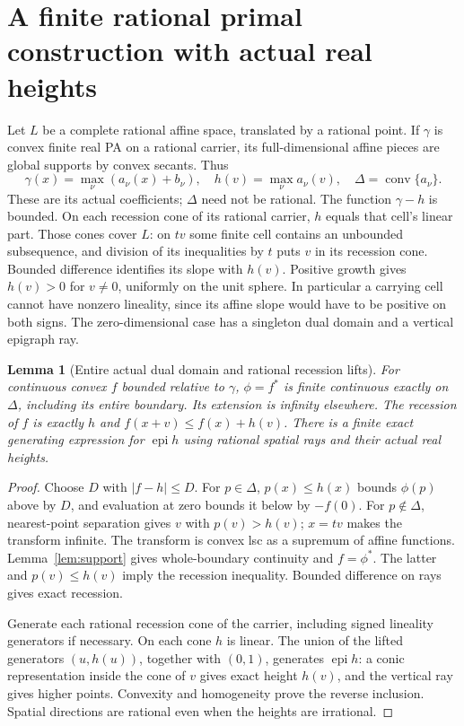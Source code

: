\documentclass[11pt]{article}
\newtheorem{lemma}[theorem]{Lemma}
\newcommand{\epi}{\operatorname{epi}}
\newcommand{\conv}{\operatorname{conv}}
\begin{document}
\section{A finite rational primal construction with actual real heights}
Let $L$ be a complete rational affine space, translated by a rational point. If $\gamma$ is convex finite real PA on a rational carrier, its full-dimensional affine pieces are global supports by convex secants. Thus
\[
\gamma(x)=\max_\nu(a_\nu(x)+b_\nu),\quad
h(v)=\max_\nu a_\nu(v),\quad \Delta=\conv\{a_\nu\}.
\]
These are its actual coefficients; $\Delta$ need not be rational. The function $\gamma-h$ is bounded. On each recession cone of its rational carrier, $h$ equals that cell's linear part. Those cones cover $L$: on $tv$ some finite cell contains an unbounded subsequence, and division of its inequalities by $t$ puts $v$ in its recession cone. Bounded difference identifies its slope with $h(v)$. Positive growth gives $h(v)>0$ for $v\ne0$, uniformly on the unit sphere. In particular a carrying cell cannot have nonzero lineality, since its affine slope would have to be positive on both signs. The zero-dimensional case has a singleton dual domain and a vertical epigraph ray.

\begin{lemma}[Entire actual dual domain and rational recession lifts]\label{lem:dual}
For continuous convex $f$ bounded relative to $\gamma$, $\phi=f^*$ is finite continuous exactly on $\Delta$, including its entire boundary. Its extension is infinity elsewhere. The recession of $f$ is exactly $h$ and $f(x+v)\leq f(x)+h(v)$. There is a finite exact generating expression for $\epi h$ using rational spatial rays and their actual real heights.
\end{lemma}
\begin{proof}
Choose $D$ with $|f-h|\leq D$. For $p\in\Delta$, $p(x)\leq h(x)$ bounds $\phi(p)$ above by $D$, and evaluation at zero bounds it below by $-f(0)$. For $p\notin\Delta$, nearest-point separation gives $v$ with $p(v)>h(v)$; $x=tv$ makes the transform infinite. The transform is convex lsc as a supremum of affine functions. Lemma~\ref{lem:support} gives whole-boundary continuity and $f=\phi^*$. The latter and $p(v)\leq h(v)$ imply the recession inequality. Bounded difference on rays gives exact recession.

Generate each rational recession cone of the carrier, including signed lineality generators if necessary. On each cone $h$ is linear. The union of the lifted generators $(u,h(u))$, together with $(0,1)$, generates $\epi h$: a conic representation inside the cone of $v$ gives exact height $h(v)$, and the vertical ray gives higher points. Convexity and homogeneity prove the reverse inclusion. Spatial directions are rational even when the heights are irrational.
\end{proof}
\end{document}

